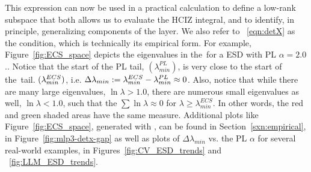 This expression can now be used in a practical calculation to define a low-rank subspace that both allows us to evaluate the HCIZ integral,
and to identify, in principle, generalizing components of the layer.
We also refer to \EQN~\ref{eqn:detX} as the \TRACELOG condition, which is technically its empirical form.
For example, Figure~\ref{fig:ECS_space} depicts the eigenvalues in the~\ECS for a \Typical ESD with PL $\alpha=2.0$..
Notice that the start of the PL tail, $(\lambda_{min}^{PL})$, is very close to the start of the~\ECS tail. $(\lambda^{ECS}_{min})$,
i.e. $\Delta \lambda_{min}:=\lambda^{ECS}_{min}-\lambda^{PL}_{min}\approx 0$.
Also, notice that while there are many large eigenvalues, $\ln\lambda>1.0$, there are numerous small eigenvalues as well,
$\ln\lambda<1.0$, such that the $\sum\ln\lambda\approx 0$ for $\lambda\ge\lambda_{min}^{ECS}$. In other words, the red and green shaded areas have the same measure.
Additional plots like Figure~\ref{fig:ECS_space}, generated with \WW,  can be found in Section~\ref{sxn:empirical},
in Figure~\ref{fig:mlp3-detx-gap}
as well as plots of $\Delta \lambda_{min}$ vs. the \WW PL $\alpha$ for several real-world examples,
in Figures~\ref{fig:CV_ESD_trends} and ~\ref{fig:LLM_ESD_trends}.

